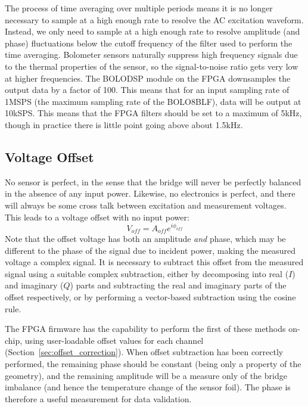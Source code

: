 \documentclass[12pt,a4paper]{article}
\begin{document}
The process of time averaging over multiple periods means it is no longer necessary to sample at a high enough rate to resolve the AC excitation
waveform. Instead, we only need to sample at a high enough rate to resolve amplitude (and phase) fluctuations below the cutoff frequency of the filter
used to perform the time averaging. Bolometer sensors naturally suppress high frequency signals due to the thermal properties of the sensor, so the
signal-to-noise ratio gets very low at higher frequencies. The BOLODSP module on the FPGA downsamples the output data by a factor of 100. This
means that for an input sampling rate of 1MSPS (the maximum sampling rate of the BOLO8BLF), data will be output at 10kSPS\@. This means that the FPGA
filters should be set to a maximum of 5kHz, though in practice there is little point going above about 1.5kHz.

\subsection{Voltage Offset}%
\label{sec:offset}
No sensor is perfect, in the sense that the bridge will never be perfectly balanced in the absence of any input power. Likewise, no electronics is perfect,
and there will always be some cross talk between excitation and measurement voltages. This leads to a voltage offset with no input power:
\begin{equation}
  \label{equ:voff}
  V_{off} = A_{off}e^{i\phi_{off}}
\end{equation}
Note that the offset voltage has both an amplitude \textit{and} phase, which may be different to the phase of the signal due to incident power, making the
measured voltage a complex signal. It is necessary to subtract this offset from the measured signal using a suitable complex subtraction, either by
decomposing into real ($I$) and imaginary ($Q$) parts and subtracting the real and imaginary parts of the offset respectively, or by performing a
vector-based subtraction using the cosine rule.

The FPGA firmware has the capability to perform the first of these methods on-chip, using user-loadable offset values for each channel
(Section~\ref{sec:offset_correction}). When offset subtraction has been correctly performed, the remaining phase should be constant (being only a property
of the geometry), and the remaining amplitude will be a measure only of the bridge imbalance (and hence the temperature change of the sensor foil). The
phase is therefore a useful measurement for data validation.
\end{document}
